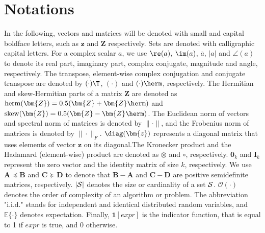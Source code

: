 








\section{Notations} 
In the following, vectors and matrices will be denoted with small and capital boldface letters, such as $\bm{z}$ and $\bm{Z}$ respectively. 
Sets are denoted with calligraphic capital letters. 
For a complex scalar $a$, we use $\re(a)$, $\im(a)$, $\overline{a}$, $|a|$ and  $\angle(a)$ to denote its real part, imaginary part, complex conjugate, magnitude and angle, respectively. 
The transpose, element-wise complex conjugation and conjugate transpose are denoted by $(\cdot)\T$, $\overline{(\cdot)}$ and $(\cdot)\herm$, respectively. 
The Hermitian and skew-Hermitian parts of a matrix $\bm{Z}$ are denoted as $\mathrm{herm}(\bm{Z})=0.5(\bm{Z}+\bm{Z}\herm)$ and $\mathrm{skew}(\bm{Z})=0.5(\bm{Z}-\bm{Z}\herm)$.
The Euclidean norm of vectors and spectral norm of matrices is denoted by $\|\cdot\|$, and the Frobenius norm of matrices is denoted by $\|\cdot\|_F$. 
$\diag(\bm{z})$ represents a diagonal matrix that uses elements of vector $\bm{z}$ on its diagonal.The Kronecker product and the Hadamard (element-wise) product are denoted as $\otimes$ and $\circ$, respectively.
$\bm{0}_k$ and $\bm{I}_k$ represent the zero vector and the identity matrix of size $k$, respectively.
We use $\bm{A}\preceq\bm{B}$ and $\bm{C}\succeq\bm{D}$ to denote that $\bm{B}-\bm{A}$ and $\bm{C}-\bm{D}$ are positive semidefinite matrices, respectively.
$|\cal{S}|$ denotes the size or cardinality of a set $\cal{S}$. $\mathcal{O}(\cdot)$ denotes the order of complexity of an algorithm or problem.
The abbreviation "i.i.d." stands for independent and identical distributed random variables, and $\mathbb{E}\{\cdot\}$ denotes expectation. 
Finally, $\bm{1}[\mathit{expr}]$ is the indicator function, that is equal to 1 if $\mathit{expr}$ is true, and 0 otherwise.